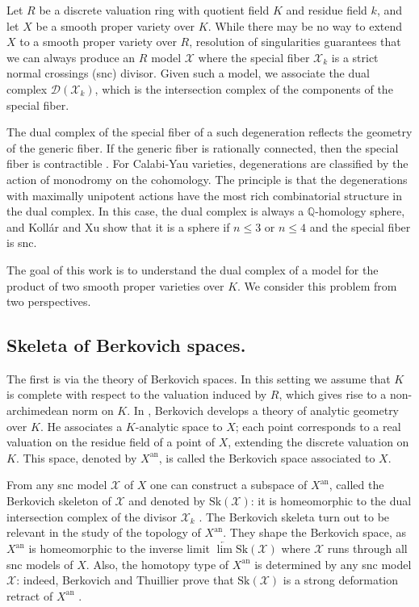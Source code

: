 \documentclass{amsart}%
\numberwithin{equation}{subsection}
\theoremstyle{plain2}
\theoremstyle{definition2}
\theoremstyle{stepstyle}
\theoremstyle{point}
\theoremstyle{subpoint}
\newcommand{\D}{{\mathcal D}}
\newcommand{\cX}{\ensuremath{\mathscr{X}}}
\newcommand{\an}{\mathrm{an}}
\newcommand{\Sk}{\mathrm{Sk}}
\begin{document}
Let $R$ be a discrete valuation ring with quotient field $K$ and residue field $k$, and let $X$ be a smooth proper variety over $K$. While there may be no way to extend $X$ to a smooth proper variety over $R$, resolution of singularities guarantees that we can always produce an $R$ model $\cX$ where the special fiber $\cX_k$ is a strict normal crossings (snc) divisor. Given such a model, we associate the dual complex $\D(\cX_k)$, which is the intersection complex of the components of the special fiber. 

The dual complex of the special fiber of a such degeneration reflects the geometry of the generic fiber. If the generic fiber is rationally connected, then the special fiber is contractible \cite{deFernexKollarXu2012}. For Calabi-Yau varieties, degenerations are classified by the action of monodromy on the cohomology. The principle is that the degenerations with maximally unipotent actions have the most rich combinatorial structure in the dual complex. In this case, the dual complex is always a $\mathbb{Q}$-homology sphere, and Koll{\'a}r and Xu \cite{KollarXu} show that it is a sphere if $n\leqslant 3$ or $n \leqslant 4$ and the special fiber is snc. 

The goal of this work is to understand the dual complex of a model for the product of two smooth proper varieties over $K$. We consider this problem from two perspectives.

\subsection{Skeleta of Berkovich spaces.} The first is via the theory of Berkovich spaces. In this setting we assume that $K$ is complete with respect to the valuation induced by $R$, which gives rise to a non-archimedean norm on $K$. In \cite{Berkovich1990}, Berkovich develops a theory of analytic geometry over $K$. He associates a $K$-analytic space to $X$; each point corresponds to a real valuation on the residue field of a point of $X$, extending the discrete valuation on $K$. This space, denoted by $X^\an$, is called the Berkovich space associated to $X$.

From any snc model $\cX$ of $X$ one can construct a subspace of $X^\an$, called the Berkovich skeleton of $\cX$ and denoted by $\Sk(\cX)$: it is homeomorphic to the dual intersection complex of the divisor $\cX_k$ \cite{MustataNicaise}.
The Berkovich skeleta turn out to be relevant in the study of the topology of $X^\an$.  They shape the Berkovich space, as $X^\an$ is homeomorphic to the inverse limit $\underleftarrow{\lim}\Sk(\cX)$ where $\cX$ runs through all snc models of $X$. Also, the homotopy type of $X^\an$ is determined by any snc model $\cX$: indeed, Berkovich and Thuillier prove that $\Sk(\cX)$ is a strong deformation retract of $X^\an$ \cite{Berkovich1990, Thuillier2007}.
\end{document}
